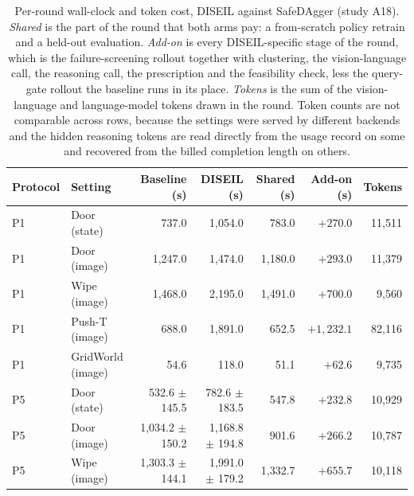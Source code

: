 \documentclass[letterpaper]{article}
\begin{document}
\begin{table}[t]
\centering
\caption{Per-round wall-clock and token cost, DISEIL against SafeDAgger (study A18).
\emph{Shared} is the part of the round that both arms pay: a from-scratch policy retrain
and a held-out evaluation. \emph{Add-on} is every DISEIL-specific stage of the round,
which is the failure-screening rollout together with clustering, the vision-language
call, the reasoning call, the prescription and the feasibility check, less the
query-gate rollout the baseline runs in its place. \emph{Tokens} is the sum of the
vision-language and language-model tokens drawn in the round. Token counts are not
comparable across rows, because the settings were served by different backends and the
hidden reasoning tokens are read directly from the usage record on some and recovered
from the billed completion length on others.}
\label{tab:cost}
\begin{tabular}{llrrrrr}
\toprule
Protocol & Setting & Baseline (s) & DISEIL (s) & Shared (s) & Add-on (s) & Tokens \\
\midrule
P1 & Door (state) & 737.0 & 1{,}054.0 & 783.0 & $+270.0$ & 11{,}511 \\
P1 & Door (image) & 1{,}247.0 & 1{,}474.0 & 1{,}180.0 & $+293.0$ & 11{,}379 \\
P1 & Wipe (image) & 1{,}468.0 & 2{,}195.0 & 1{,}491.0 & $+700.0$ & 9{,}560 \\
P1 & Push-T (image) & 688.0 & 1{,}891.0 & 652.5 & $+1{,}232.1$ & 82{,}116 \\
P1 & GridWorld (image) & 54.6 & 118.0 & 51.1 & $+62.6$ & 9{,}735 \\
\midrule
P5 & Door (state) & 532.6 $\pm$ 145.5 & 782.6 $\pm$ 183.5 & 547.8 & $+232.8$ & 10{,}929 \\
P5 & Door (image) & 1{,}034.2 $\pm$ 150.2 & 1{,}168.8 $\pm$ 194.8 & 901.6 & $+266.2$ & 10{,}787 \\
P5 & Wipe (image) & 1{,}303.3 $\pm$ 144.1 & 1{,}991.0 $\pm$ 179.2 & 1{,}332.7 & $+655.7$ & 10{,}118 \\
\bottomrule
\end{tabular}
\end{table}
\end{document}
